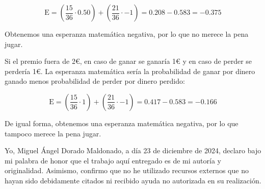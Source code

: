 \documentclass{llncs}
\begin{document}
\begin{equation*}
	\text{E} = (\frac{15}{36} \cdot 0.50) + (\frac{21}{36} \cdot -1) = 0.208 - 0.583 = -0.375
\end{equation*}

Obtenemos una esperanza matemática negativa, por lo que no merece la pena jugar.

\vspace{0.25cm}
Si el premio fuera de 2€, en caso de ganar se ganaría 1€ y en caso de perder se perdería 1€. La esperanza matemática sería la probabilidad de ganar por dinero ganado menos probabilidad de perder por dinero perdido:

\begin{equation*}
	\text{E} = (\frac{15}{36} \cdot 1) + (\frac{21}{36} \cdot -1) = 0.417 - 0.583 = -0.166
\end{equation*}

De igual forma, obtenemos una esperanza matemática negativa, por lo que tampoco merece la pena jugar.

\newpage
Yo, Miguel Ángel Dorado Maldonado, a día 23 de diciembre de 2024, declaro bajo mi palabra de honor que el trabajo aquí entregado es de mi autoría y originalidad. Asimismo, confirmo que no he utilizado recursos externos que no hayan sido debidamente citados ni recibido ayuda no autorizada en su realización.
\end{document}

